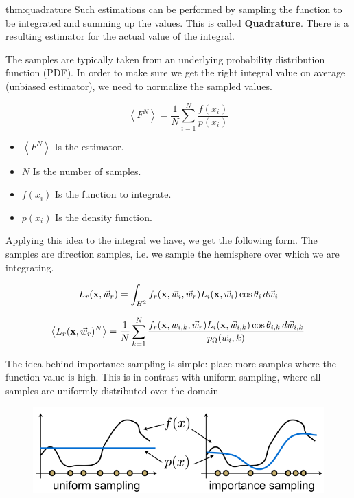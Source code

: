 \documentclass{article}
\begin{document}
\vspace{5px}


\begin{defin}[Quadrature]{thm:quadrature}
    Such estimations can be performed by sampling the function to be integrated and summing up the values. 
    This is called \textbf{Quadrature}. There is a resulting estimator for the actual value of the 
    integral.

    \vspace{5px}

    The samples are typically taken from an underlying probability distribution function (PDF). In order
    to make sure we get the right integral value on average (unbiased estimator), we need to normalize 
    the sampled values.

    \[
        \left< F^N \right> = \frac{1}{N} \sum_{i=1}^{N} \frac{f(x_i)}{p(x_i)}
    \]

    \begin{itemize}[itemsep=-2px, label={--}]
        \item \(\left< F^N \right>\) Is the estimator.
        \item \(N\) \phantom{ab} Is the number of samples.
        \item \(f(x_i)\) Is the function to integrate.
        \item \(p(x_i)\) Is the density function.
    \end{itemize}
\end{defin}

Applying this idea to the integral we have, we get the following form.
The samples are direction samples, i.e. we sample the hemisphere over which we are integrating.


\[
    L_r (\text{\textbf{x}}, \vec{w}_r) = \int_{H^2} f_r(\text{\textbf{x}}, \vec{w}_i, \vec{w}_r)L_i(\text{\textbf{x}}, \vec{w}_i) \cos \theta_i \, d \vec{w}_i
\]

\[
    \left< L_r(\text{\textbf{x}}, \vec{w}_r)^N \right> = \frac{1}{N} \sum_{k=1}^{N} 
    \frac{f_r(\text{\textbf{x}}, w_{i,k} , \vec{w}_r) L_i(\text{\textbf{x}}, \vec{w}_{i,k}) \cos \theta_{i,k}
    \, d \vec{w}_{i,k}}{p_\Omega (\vec{w}_i, k)}
\]

The idea behind importance sampling is simple: place more samples where the function value is high.
This is in contrast with uniform sampling, where all samples are uniformly distributed over the domain

\begin{figure}[!ht]
    \centering
    \includegraphics[width=0.7\linewidth]{images/importance_sampling.png}
\end{figure}
\end{document}
